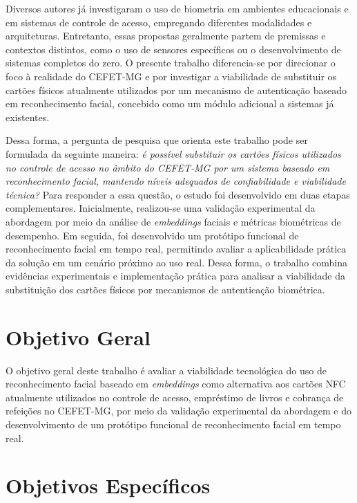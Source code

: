 Diversos autores já investigaram o uso de biometria em ambientes educacionais e em sistemas de controle de acesso, empregando diferentes modalidades e arquiteturas. Entretanto, essas propostas geralmente partem de premissas e contextos distintos, como o uso de sensores específicos ou o desenvolvimento de sistemas completos do zero. O presente trabalho diferencia-se por direcionar o foco à realidade do \acs{CEFET-MG} e por investigar a viabilidade de substituir os cartões físicos atualmente utilizados por um mecanismo de autenticação baseado em reconhecimento facial, concebido como um módulo adicional a sistemas já existentes.

Dessa forma, a pergunta de pesquisa que orienta este trabalho pode ser formulada da seguinte maneira: \textit{é possível substituir os cartões físicos utilizados no controle de acesso no âmbito do \acs{CEFET-MG} por um sistema baseado em reconhecimento facial, mantendo níveis adequados de confiabilidade e viabilidade técnica?} Para responder a essa questão, o estudo foi desenvolvido em duas etapas complementares. Inicialmente, realizou-se uma validação experimental da abordagem por meio da análise de \textit{embeddings} faciais e métricas biométricas de desempenho. Em seguida, foi desenvolvido um protótipo funcional de reconhecimento facial em tempo real, permitindo avaliar a aplicabilidade prática da solução em um cenário próximo ao uso real. Dessa forma, o trabalho combina evidências experimentais e implementação prática para analisar a viabilidade da substituição dos cartões físicos por mecanismos de autenticação biométrica.

\section{Objetivo Geral}

O objetivo geral deste trabalho é avaliar a viabilidade tecnológica do uso de reconhecimento facial baseado em \textit{embeddings} como alternativa aos cartões \acs{NFC} atualmente utilizados no controle de acesso, empréstimo de livros e cobrança de refeições no \acs{CEFET-MG}, por meio da validação experimental da abordagem e do desenvolvimento de um protótipo funcional de reconhecimento facial em tempo real.

\section{Objetivos Específicos}

